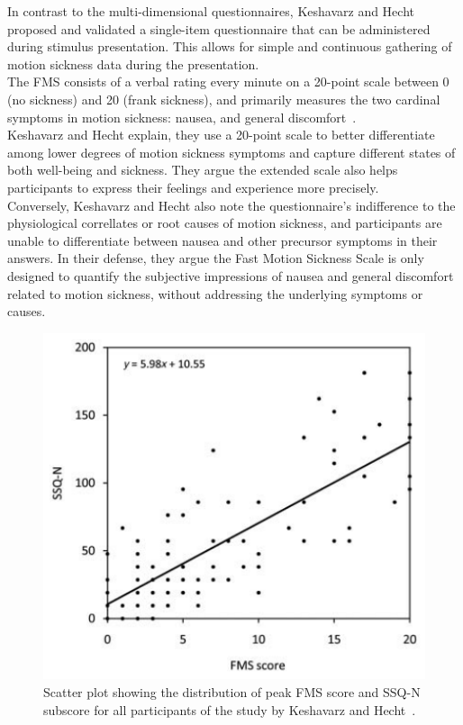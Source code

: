 In contrast to the multi-dimensional questionnaires, Keshavarz and Hecht~\cite{Keshavarz2011} proposed and validated
a single-item questionnaire that can be administered during stimulus presentation.
This allows for simple and continuous gathering of motion sickness data during the presentation.
\\
The FMS consists of a verbal rating every minute on a 20-point scale between 0 (no sickness) and 20 (frank sickness),
and primarily measures the two cardinal symptoms in motion sickness: nausea, and general
discomfort~\cite{Keshavarz2011}.
\\
Keshavarz and Hecht explain, they use a 20-point scale to better differentiate among lower
degrees of motion sickness symptoms and capture different states of both well-being and sickness.
They argue the extended scale also helps participants to express their feelings and experience more precisely.
\\
Conversely, Keshavarz and Hecht also note the questionnaire's indifference to the physiological correllates or root
causes of motion sickness, and participants are unable to differentiate between nausea and other precursor symptoms
in their answers.
In their defense, they argue the Fast Motion Sickness Scale is only designed to quantify the subjective impressions
of nausea and general discomfort related to motion sickness, without addressing the underlying symptoms or causes.
\begin{figure}[h]
    \centering
    \includegraphics[width=\textwidth/2]{content/2_related_work/img/FMStoSSQcorrelation[Keshavarz2011]}
    \caption{Scatter plot showing the distribution of peak FMS score and SSQ-N subscore for all participants of the
    study by Keshavarz and Hecht~\cite{Keshavarz2011}.}
    \label{fig:fms-ssq-correlation}
\end{figure}
